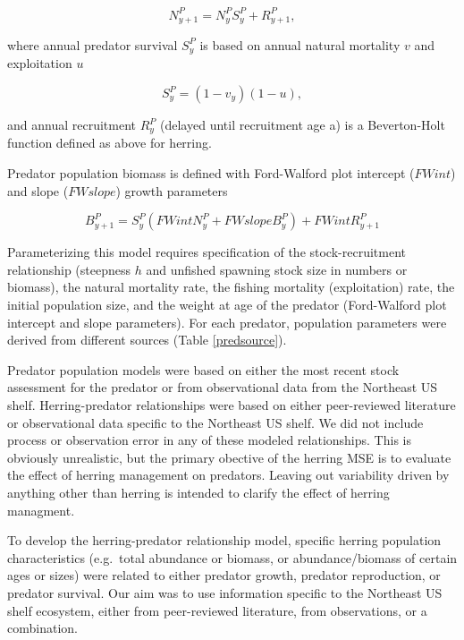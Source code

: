 \documentclass[]{article}
\begin{document}
\begin{equation}
N_{y+1}^P = N_{y}^PS_{y}^P +  R_{y+1}^P \label{delaydiffN_equation},
\end{equation}

where annual predator survival \(S_{y}^P\) is based on annual natural
mortality \(v\) and exploitation \(u\)

\begin{equation}
S_{y}^P =  (1-v_{y})(1-u) \label{survival_equation},
\end{equation}

and annual recruitment \(R_{y}^P\) (delayed until recruitment age a) is
a Beverton-Holt function defined as above for herring.

Predator population biomass is defined with Ford-Walford plot intercept
(\(FWint\)) and slope (\(FWslope\)) growth parameters

\begin{equation}
B_{y+1}^P = S_{y}^P (FWint N_{y}^P + FWslope B_{y}^P) + FWint R_{y+1}^P \label{delaydiffB_equation}
\end{equation}

Parameterizing this model requires specification of the
stock-recruitment relationship (steepness \(h\) and unfished spawning
stock size in numbers or biomass), the natural mortality rate, the
fishing mortality (exploitation) rate, the initial population size, and
the weight at age of the predator (Ford-Walford plot intercept and slope
parameters). For each predator, population parameters were derived from
different sources (Table \ref{predsource}).

Predator population models were based on either the most recent stock
assessment for the predator or from observational data from the
Northeast US shelf. Herring-predator relationships were based on either
peer-reviewed literature or observational data specific to the Northeast
US shelf. We did not include process or observation error in any of
these modeled relationships. This is obviously unrealistic, but the
primary obective of the herring MSE is to evaluate the effect of herring
management on predators. Leaving out variability driven by anything
other than herring is intended to clarify the effect of herring
managment.

To develop the herring-predator relationship model, specific herring
population characteristics (e.g.~total abundance or biomass, or
abundance/biomass of certain ages or sizes) were related to either
predator growth, predator reproduction, or predator survival. Our aim
was to use information specific to the Northeast US shelf ecosystem,
either from peer-reviewed literature, from observations, or a
combination.
\end{document}

